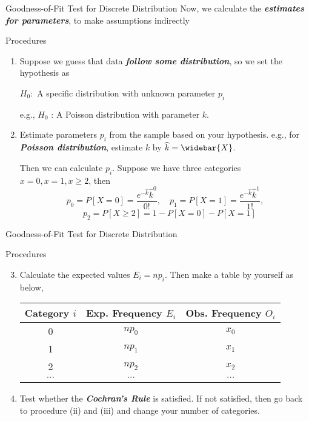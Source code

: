 \documentclass{beamer}
\newcommand{\bb}[1]{\textcolor{antiquefuchsia}{\textbf{\textit{#1}}}}
\begin{document}
\begin{frame}{Goodness-of-Fit Test for Discrete Distribution}
Now, we calculate the \bb{estimates for parameters}, to make assumptions indirectly
\begin{block}{Procedures}
\begin{enumerate}
\item Suppose we guess that data \bb{follow some distribution}, so we set the hypothesis as
\begin{center}
$H_{0}:$ A specific distribution with unknown parameter $p_{i}$

e.g.,
$H_{0}$ : A Poisson distribution with parameter $k .$
\end{center}
\item Estimate parameters $p_{i}$ from the sample based on your hypothesis.
e.g., for \bb{Poisson distribution}, estimate $k$ by
$
\widehat{k}=\widebar{X}
$.

Then we can calculate $p_{i}$. Suppose we have three categories $x=0, x=1, x \geq 2$, then
$$
p_{0}=P[X=0]=\frac{e^{-\widehat{k}} \widehat{k}^{0}}{0 !}, \quad p_{1}=P[X=1]=\frac{e^{-\widehat{k}} \widehat{k}^{1}}{1 !},$$$$ \quad p_{2}=P[X \geq 2]=1-P[X=0]-P[X=1]
$$
\end{enumerate}
\end{block}
\end{frame}

\begin{frame}{Goodness-of-Fit Test for Discrete Distribution}
\begin{block}{Procedures}
\begin{enumerate}
\setcounter{enumi}{2}
\item Calculate the expected values $E_{i}=n p_{i}$. Then make a table by yourself as below,
\begin{tabular}{ccc}
\hline Category $i$ & Exp. Frequency $E_{i}$ & Obs. Frequency $O_{i}$ \\
\hline 0 & $n p_{0}$ & $x_{0}$ \\
1 & $n p_{1}$ & $x_{1}$ \\
2 & $n p_{2}$ & $x_{2}$ \\
$\cdots$ & $\cdots$ & $\cdots$ \\
\hline
\end{tabular}
\item Test whether the \bb{Cochran's Rule} is satisfied. If not satisfied, then go back to procedure (ii) and (iii) and change your number of categories.
\end{enumerate}
\end{block}
\end{frame}
\end{document}
